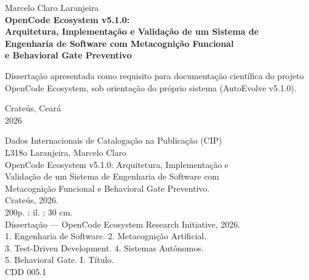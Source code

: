 \documentclass[12pt,a4paper,oneside]{abntex2}
\begin{document}
\begin{folhaderosto}
    \centering
    {\ABNTEXchapterfont\Large Marcelo Claro Laranjeira}\\[1.5cm]
    {\ABNTEXchapterfont\Large\bfseries OpenCode Ecosystem v5.1.0:\\
    Arquitetura, Implementação e Validação de um Sistema de\\
    Engenharia de Software com Metacognição Funcional\\
    e Behavioral Gate Preventivo}\\[2cm]
    \begin{flushright}
    \begin{minipage}{0.5\textwidth}
    Dissertação apresentada como requisito para documentação científica do projeto OpenCode Ecosystem, sob orientação do próprio sistema (AutoEvolve v5.1.0).
    \end{minipage}
    \end{flushright}
    \vfill
    {\large Crateús, Ceará\\2026}
\end{folhaderosto}

\begin{fichacatalografica}
    \vspace*{\fill}
    \begin{center}
    \begin{minipage}{0.8\textwidth}
    \small
    Dados Internacionais de Catalogação na Publicação (CIP)\\[0.5cm]
    L318o \hspace{0.5cm} Laranjeira, Marcelo Claro\\
    \hspace{1.2cm} OpenCode Ecosystem v5.1.0: Arquitetura, Implementação e\\
    \hspace{1.2cm} Validação de um Sistema de Engenharia de Software com\\
    \hspace{1.2cm} Metacognição Funcional e Behavioral Gate Preventivo.\\
    \hspace{1.2cm} Crateús, 2026.\\
    \hspace{1.2cm} 200p. : il. ; 30 cm.\\
    \hspace{1.2cm} Dissertação — OpenCode Ecosystem Research Initiative, 2026.\\
    \hspace{1.2cm} 1. Engenharia de Software. 2. Metacognição Artificial.\\
    \hspace{1.2cm} 3. Test-Driven Development. 4. Sistemas Autônomos.\\
    \hspace{1.2cm} 5. Behavioral Gate. I. Título.\\[0.5cm]
    \hspace{1.2cm} CDD 005.1
    \end{minipage}
    \end{center}
\end{fichacatalografica}
\end{document}
